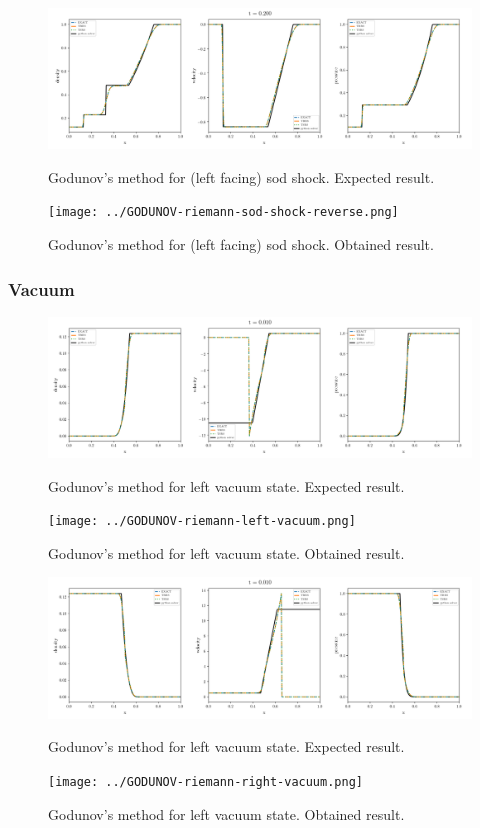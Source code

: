\begin{figure}[htbp]
    \centering
	\includegraphics[width=.9\textwidth]{./figures/GODUNOV-riemann-sod-shock-reverse.png}%
	\caption{Godunov's method for (left facing) sod shock. Expected result.}
	\texttt{[image: ../GODUNOV-riemann-sod-shock-reverse.png]}%
	\caption{Godunov's method for (left facing) sod shock. Obtained result.}
\end{figure}










\clearpage
\subsubsection{Vacuum}

\begin{figure}[htbp]
    \centering
	\includegraphics[width=.9\textwidth]{./figures/GODUNOV-riemann-left-vacuum.png}%
	\caption{Godunov's method for left vacuum state. Expected result.}
	\texttt{[image: ../GODUNOV-riemann-left-vacuum.png]}
	\caption{Godunov's method for left vacuum state. Obtained result.}
\end{figure}


\begin{figure}[htbp]
    \centering
	\includegraphics[width=.9\textwidth]{./figures/GODUNOV-riemann-right-vacuum.png}%
	\caption{Godunov's method for left vacuum state. Expected result.}
	\texttt{[image: ../GODUNOV-riemann-right-vacuum.png]}
	\caption{Godunov's method for left vacuum state. Obtained result.}
\end{figure}


